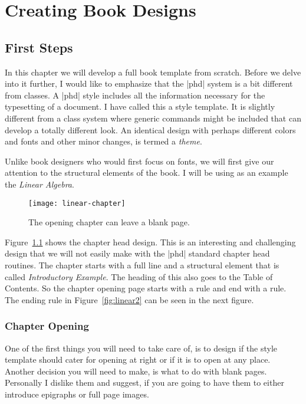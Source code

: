 \chapter{Creating Book Designs}

\section{First Steps}

In this chapter we will develop a full book template from scratch. Before we delve into it further, I would like to emphasize that the |phd| system is a bit different from classes. A |phd|  style includes all the information necessary for the typesetting of a document. I have called this a style template. It is slightly different from a class system where generic commands might be included that can develop a totally different look. An identical design with perhaps different colors and fonts and other minor changes, is termed a \textit{theme}. 

Unlike book designers who would first focus on fonts, we will first give our attention to the structural elements of the book. I will be using as an example the \textit{Linear Algebra}. 

\begin{figure}[htbp]
\texttt{[image: linear-chapter]}
\caption{The opening chapter can leave a blank page. }
\label{fig:linear1}
\end{figure}

Figure~\ref{fig:linear1} shows the chapter head design. This is an interesting and challenging design that we will not
easily make with the |phd| standard chapter head routines. The chapter starts with a full line and a structural element that is called \emph{Introductory Example}. The heading of this also goes to the Table of Contents. So the chapter opening page starts with a rule and end with a rule. The ending rule in Figure~\ref{fig:linear2} can be seen in the next figure. 

\subsection{Chapter Opening}

One of the first things you will need to take care of, is to design if the style template should cater for opening at right or if it is to open at any place. Another decision you will need to make, is what to do with blank pages. Personally I dislike them and suggest, if you are going to have them to either introduce epigraphs or full page images.

